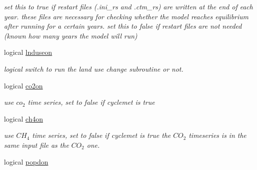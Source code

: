 \begin{DoxyCompactItemize}
\begin{DoxyCompactList}\small\item\em set this to true if restart files (.ini\+\_\+rs and .ctm\+\_\+rs) are written at the end of each year. these files are necessary for checking whether the model reaches equilibrium after running for a certain years. set this to false if restart files are not needed (known how many years the model will run) \end{DoxyCompactList}\item 
\hypertarget{structctem__statevars_1_1ctem__switches_a88a5da5983fd89ae543d125e6e9cc7b0}{}logical \hyperlink{structctem__statevars_1_1ctem__switches_a88a5da5983fd89ae543d125e6e9cc7b0}{lnduseon}\label{structctem__statevars_1_1ctem__switches_a88a5da5983fd89ae543d125e6e9cc7b0}

\begin{DoxyCompactList}\small\item\em logical switch to run the land use change subroutine or not. \end{DoxyCompactList}\item 
\hypertarget{structctem__statevars_1_1ctem__switches_adfe393edd213126b62732ca16010c29b}{}logical \hyperlink{structctem__statevars_1_1ctem__switches_adfe393edd213126b62732ca16010c29b}{co2on}\label{structctem__statevars_1_1ctem__switches_adfe393edd213126b62732ca16010c29b}

\begin{DoxyCompactList}\small\item\em use $co_2$ time series, set to false if cyclemet is true \end{DoxyCompactList}\item 
\hypertarget{structctem__statevars_1_1ctem__switches_af536584569f7fe698dcc5ecee2e241b2}{}logical \hyperlink{structctem__statevars_1_1ctem__switches_af536584569f7fe698dcc5ecee2e241b2}{ch4on}\label{structctem__statevars_1_1ctem__switches_af536584569f7fe698dcc5ecee2e241b2}

\begin{DoxyCompactList}\small\item\em use $CH_4$ time series, set to false if cyclemet is true the $CO_2$ timeseries is in the same input file as the $CO_2$ one. \end{DoxyCompactList}\item 
\hypertarget{structctem__statevars_1_1ctem__switches_a73f9b285933c7268bccdd6e1377fdf49}{}logical \hyperlink{structctem__statevars_1_1ctem__switches_a73f9b285933c7268bccdd6e1377fdf49}{popdon}\label{structctem__statevars_1_1ctem__switches_a73f9b285933c7268bccdd6e1377fdf49}


\end{DoxyCompactItemize}
